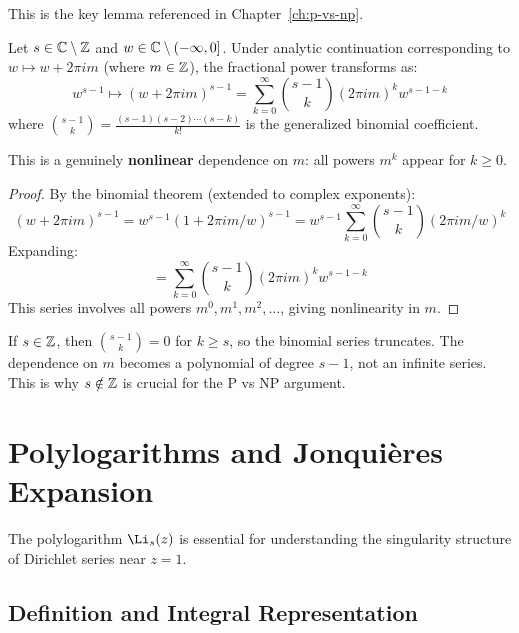 This is the key lemma referenced in Chapter~\ref{ch:p-vs-np}.

\begin{lemma}\label{lem:frac-nonlinear}
Let $s \in \mathbb{C} \setminus \mathbb{Z}$ and $w \in \mathbb{C} \setminus (-\infty, 0]$. Under analytic continuation corresponding to $w \mapsto w + 2\pi i m$ (where $m \in \mathbb{Z}$), the fractional power transforms as:
\begin{equation}
w^{s-1} \mapsto (w + 2\pi i m)^{s-1} = \sum_{k=0}^{\infty} \binom{s-1}{k} (2\pi i m)^k w^{s-1-k}
\end{equation}
where $\binom{s-1}{k} = \frac{(s-1)(s-2) \cdots (s-k)}{k!}$ is the generalized binomial coefficient.

This is a genuinely \textbf{nonlinear} dependence on $m$: all powers $m^k$ appear for $k \geq 0$.
\end{lemma}

\begin{proof}
By the binomial theorem (extended to complex exponents):
\begin{equation}
(w + 2\pi i m)^{s-1} = w^{s-1} (1 + 2\pi i m / w)^{s-1} = w^{s-1} \sum_{k=0}^{\infty} \binom{s-1}{k} (2\pi i m / w)^k
\end{equation}
Expanding:
\begin{equation}
= \sum_{k=0}^{\infty} \binom{s-1}{k} (2\pi i m)^k w^{s-1-k}
\end{equation}
This series involves all powers $m^0, m^1, m^2, \ldots$, giving nonlinearity in $m$.
\end{proof}

\begin{remark}\label{rem:integer-s}
If $s \in \mathbb{Z}$, then $\binom{s-1}{k} = 0$ for $k \geq s$, so the binomial series truncates. The dependence on $m$ becomes a polynomial of degree $s-1$, not an infinite series. This is why $s \notin \mathbb{Z}$ is crucial for the P vs NP argument.
\end{remark}

\section{Polylogarithms and Jonquières Expansion}
\label{sec:polylogarithms}

The polylogarithm $\Li_s(z)$ is essential for understanding the singularity structure of Dirichlet series near $z = 1$.

\subsection{Definition and Integral Representation}

